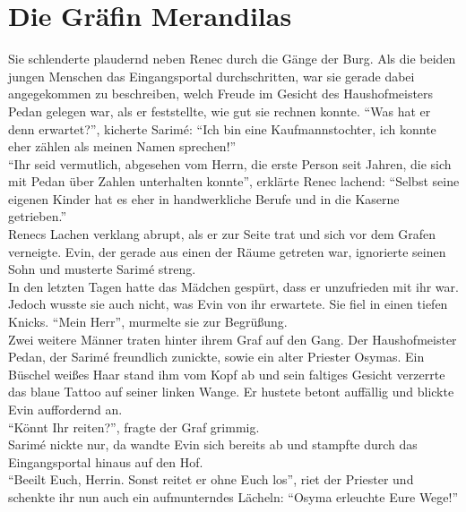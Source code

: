 \chapter{Die Gräfin Merandilas}


Sie schlenderte plaudernd neben Renec durch die Gänge der Burg. Als die beiden jungen Menschen das 
Eingangsportal durchschritten, war sie gerade dabei angegekommen zu beschreiben, welch Freude im 
Gesicht des Haushofmeisters Pedan gelegen war, als er feststellte, wie gut sie rechnen konnte. ``Was 
hat er denn erwartet?'', kicherte Sarimé: ``Ich bin eine Kaufmannstochter, ich konnte eher zählen 
als meinen Namen sprechen!''\\
``Ihr seid vermutlich, abgesehen vom Herrn, die erste Person seit Jahren, die sich mit Pedan über 
Zahlen unterhalten konnte'', erklärte Renec lachend: ``Selbst seine eigenen Kinder hat es eher in 
handwerkliche Berufe und in die Kaserne getrieben.''\\
Renecs Lachen verklang abrupt, als er zur Seite trat und sich vor dem Grafen verneigte. Evin, der 
gerade aus einen der Räume getreten war, ignorierte seinen Sohn und musterte Sarimé streng.\\
In den letzten Tagen hatte das Mädchen gespürt, dass er unzufrieden mit ihr war. Jedoch wusste sie 
auch nicht, was Evin von ihr erwartete. Sie fiel in einen tiefen Knicks. ``Mein Herr'', murmelte 
sie zur Begrüßung.\\
Zwei weitere Männer traten hinter ihrem Graf auf den Gang. Der Haushofmeister Pedan, der Sarimé 
freundlich zunickte, sowie ein alter Priester Osymas. Ein Büschel weißes Haar stand ihm vom Kopf ab 
und sein faltiges Gesicht verzerrte das blaue Tattoo auf seiner linken Wange. Er hustete betont 
auffällig und blickte Evin auffordernd an.\\
``Könnt Ihr reiten?'', fragte der Graf grimmig.\\
Sarimé nickte nur, da wandte Evin sich bereits ab und stampfte durch das Eingangsportal hinaus auf 
den Hof.\\
``Beeilt Euch, Herrin. Sonst reitet er ohne Euch los'', riet der Priester und schenkte ihr nun auch 
ein aufmunterndes Lächeln: ``Osyma erleuchte Eure Wege!''\\

